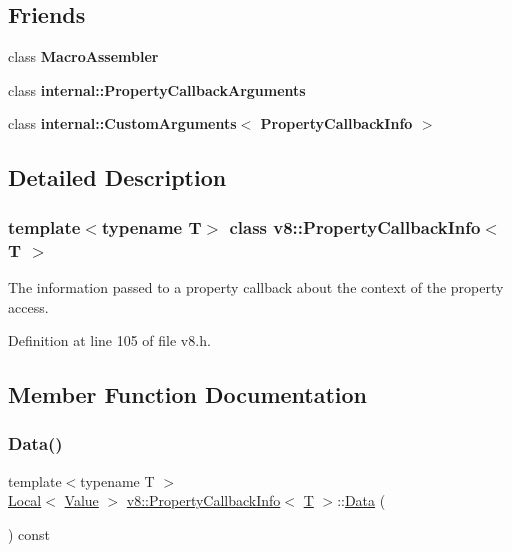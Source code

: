 \subsection*{Friends}
\begin{DoxyCompactItemize}
\item 
\mbox{\label{classv8_1_1PropertyCallbackInfo_ae605ff1d9d93250ace8a0a8b8d1dee67}} 
class {\bfseries Macro\+Assembler}
\item 
\mbox{\label{classv8_1_1PropertyCallbackInfo_a1ba96a1268a72c23f50314cd99c76f1b}} 
class {\bfseries internal\+::\+Property\+Callback\+Arguments}
\item 
\mbox{\label{classv8_1_1PropertyCallbackInfo_ad1d1e15ddaed2ab44e8f21c5564881ba}} 
class {\bfseries internal\+::\+Custom\+Arguments$<$ Property\+Callback\+Info $>$}
\end{DoxyCompactItemize}


\subsection{Detailed Description}
\subsubsection*{template$<$typename T$>$\newline
class v8\+::\+Property\+Callback\+Info$<$ T $>$}

The information passed to a property callback about the context of the property access. 

Definition at line 105 of file v8.\+h.



\subsection{Member Function Documentation}
\mbox{\label{classv8_1_1PropertyCallbackInfo_a0156bad4329132beddee04f2d000c617}} 
\subsubsection{\texorpdfstring{Data()}{Data()}}
{\footnotesize\ttfamily template$<$typename T $>$ \\
\mbox{\hyperlink{classv8_1_1Local}{Local}}$<$ \mbox{\hyperlink{classv8_1_1Value}{Value}} $>$ \mbox{\hyperlink{classv8_1_1PropertyCallbackInfo}{v8\+::\+Property\+Callback\+Info}}$<$ \mbox{\hyperlink{classv8_1_1internal_1_1torque_1_1T}{T}} $>$\+::\mbox{\hyperlink{classv8_1_1Data}{Data}} (\begin{DoxyParamCaption}{ }\end{DoxyParamCaption}) const}


